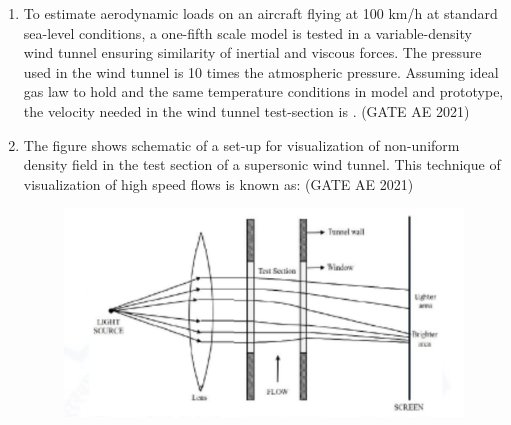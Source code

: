 \documentclass[journal,12pt,onecolumn]{IEEEtran}
\theoremstyle{remark}
\begin{document}
\begin{flushleft}
\begin{enumerate}
\begin{enumerate}
\end{enumerate}

\item To estimate aerodynamic loads on an aircraft flying at 100 km/h at standard sea-level conditions, a one-fifth scale model is tested in a variable-density wind tunnel ensuring similarity of inertial and viscous forces. The pressure used in the wind tunnel is 10 times the atmospheric pressure. Assuming ideal gas law to hold and the same temperature conditions in model and prototype, the velocity needed in the wind tunnel test-section is \underline{\hspace{2cm}}. \hfill (GATE AE 2021)

\begin{enumerate}
\end{enumerate}
\item The figure shows schematic of a set-up for visualization of non-uniform density field in the test section of a supersonic wind tunnel. This technique of visualization of high speed flows is known as:
\hfill (GATE AE 2021)
\begin{figure}[H]
    \centering
    \includegraphics[width=0.5\columnwidth]{figs/fi1.png}
    \caption{}
    \label{fig:placeholder}
\end{figure}
\begin{enumerate}
\end{enumerate}




\end{enumerate}
\end{flushleft}
\end{document}
